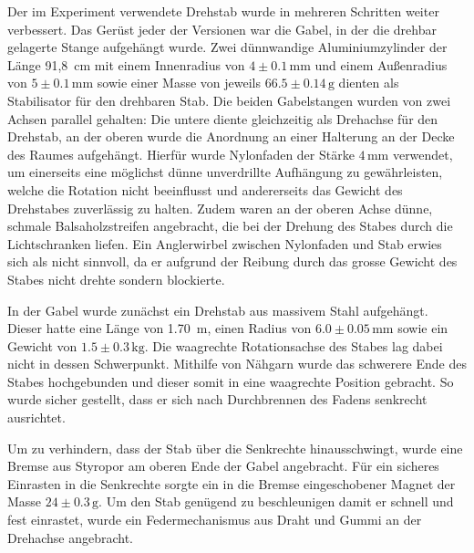 \documentclass[11pt]{scrartcl}
\newcommand{\unit}[1]{\ensuremath{\,\mathrm{#1}}} %
\begin{document}
Der im Experiment verwendete Drehstab wurde in mehreren Schritten weiter verbessert. Das Ger\"ust jeder der Versionen war die Gabel, in der die drehbar gelagerte Stange aufgeh\"angt wurde. Zwei d\"unnwandige Aluminiumzylinder der L\"ange 91,8 \unit{cm} mit einem Innenradius von $4\pm 0.1\unit{mm}$ und einem Au\ss{}enradius von $5\pm 0.1\unit{mm}$ sowie einer Masse von jeweils $66.5\pm 0.14\unit{g}$ dienten als Stabilisator f\"ur den drehbaren Stab. Die beiden Gabelstangen wurden von zwei Achsen parallel gehalten: Die untere diente gleichzeitig als Drehachse f\"ur den Drehstab, an der oberen wurde die Anordnung an einer Halterung an der Decke des Raumes aufgeh\"angt. Hierf\"ur wurde Nylonfaden der St\"arke $4\unit{mm}$
 verwendet, um einerseits eine m\"oglichst d\"unne unverdrillte Aufh\"angung zu gew\"ahrleisten, welche die Rotation nicht beeinflusst und andererseits das Gewicht des Drehstabes zuverl\"assig zu halten. Zudem waren an der oberen Achse d\"unne, schmale Balsaholzstreifen angebracht, die bei der Drehung des Stabes durch die Lichtschranken liefen. Ein Anglerwirbel zwischen Nylonfaden und Stab erwies sich als nicht sinnvoll, da er aufgrund der Reibung durch das grosse Gewicht des Stabes nicht drehte sondern blockierte.

In der Gabel wurde zun\"achst ein Drehstab aus massivem Stahl aufgeh\"angt. Dieser hatte eine L\"ange von 1.70 \unit{m}, einen Radius von $6.0\pm 0.05\unit{mm}$ sowie ein Gewicht von $1.5\pm 0.3\unit{kg}$. Die waagrechte Rotationsachse des Stabes lag dabei nicht in dessen Schwerpunkt. Mithilfe von N\"ahgarn wurde das schwerere Ende des Stabes hochgebunden und dieser somit in eine waagrechte Position gebracht. So wurde sicher gestellt, dass er sich nach Durchbrennen des Fadens senkrecht ausrichtet.

Um zu verhindern, dass der Stab \"uber die Senkrechte hinausschwingt, wurde eine Bremse aus Styropor am oberen Ende der Gabel angebracht. F\"ur ein sicheres Einrasten in die Senkrechte sorgte ein in die Bremse eingeschobener Magnet der Masse $24 \pm 0.3\unit{g}$. Um den Stab gen\"ugend zu beschleunigen damit er schnell und fest einrastet, wurde ein Federmechanismus aus Draht und Gummi an der Drehachse angebracht. %
%
\end{document}
